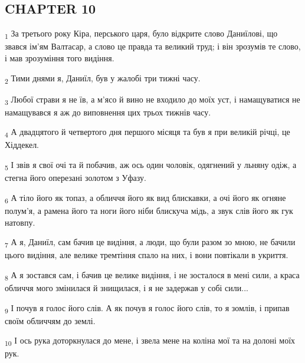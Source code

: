 \subsection{CHAPTER 10}
\begin{tcolorbox}
\textsubscript{1} За третього року Кіра, перського царя, було відкрите слово Даниїлові, що звався ім'ям Валтасар, а слово це правда та великий труд; і він зрозумів те слово, і мав зрозуміння того видіння.
\end{tcolorbox}
\begin{tcolorbox}
\textsubscript{2} Тими днями я, Даниїл, був у жалобі три тижні часу.
\end{tcolorbox}
\begin{tcolorbox}
\textsubscript{3} Любої страви я не їв, а м'ясо й вино не входило до моїх уст, і намащуватися не намащувався я аж до виповнення цих трьох тижнів часу.
\end{tcolorbox}
\begin{tcolorbox}
\textsubscript{4} А двадцятого й четвертого дня першого місяця та був я при великій річці, це Хіддекел.
\end{tcolorbox}
\begin{tcolorbox}
\textsubscript{5} І звів я свої очі та й побачив, аж ось один чоловік, одягнений у льняну одіж, а стегна його оперезані золотом з Уфазу.
\end{tcolorbox}
\begin{tcolorbox}
\textsubscript{6} А тіло його як топаз, а обличчя його як вид блискавки, а очі його як огняне полум'я, а рамена його та ноги його ніби блискуча мідь, а звук слів його як гук натовпу.
\end{tcolorbox}
\begin{tcolorbox}
\textsubscript{7} А я, Даниїл, сам бачив це видіння, а люди, що були разом зо мною, не бачили цього видіння, але велике тремтіння спало на них, і вони повтікали в укриття.
\end{tcolorbox}
\begin{tcolorbox}
\textsubscript{8} А я зостався сам, і бачив це велике видіння, і не зосталося в мені сили, а краса обличчя мого змінилася й знищилася, і я не задержав у собі сили...
\end{tcolorbox}
\begin{tcolorbox}
\textsubscript{9} І почув я голос його слів. А як почув я голос його слів, то я зомлів, і припав своїм обличчям до землі.
\end{tcolorbox}
\begin{tcolorbox}
\textsubscript{10} І ось рука доторкнулася до мене, і звела мене на коліна мої та на долоні моїх рук.
\end{tcolorbox}

